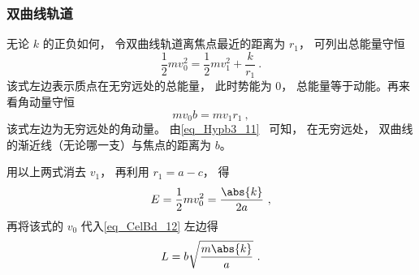 \subsubsection{双曲线轨道}
无论 $k$ 的正负如何， 令双曲线轨道离焦点最近的距离为 $r_1$， 可列出总能量守恒
\begin{equation}\label{eq_CelBd_11}
\frac12 mv_0^2 = \frac12 mv_1^2 + \frac{k}{r_1}~.
\end{equation}
该式左边表示质点在无穷远处的总能量， 此时势能为 $0$， 总能量等于动能。再来看角动量守恒
\begin{equation}\label{eq_CelBd_12}
m v_0 b = m v_1 r_1~,
\end{equation}
该式左边为无穷远处的角动量。 由\autoref{eq_Hypb3_11}~ 可知， 在无穷远处， 双曲线的渐近线（无论哪一支）与焦点的距离为 $b$。

用以上两式消去 $v_1$， 再利用 $r_1 = a - c$， 得
\begin{equation}\label{eq_CelBd_13}
E = \frac 12 m v_0^2 = \frac{\abs{k}}{2a}~,
\end{equation}
再将该式的 $v_0$ 代入\autoref{eq_CelBd_12} 左边得
\begin{equation}
L = b\sqrt{\frac{m\abs{k}}{a}}~.
\end{equation}
